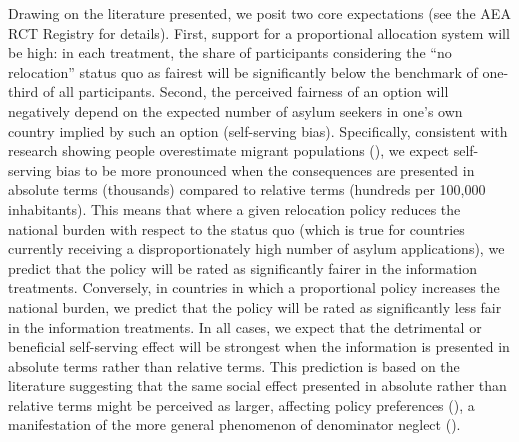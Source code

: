\documentclass[
  12pt,
  a4paper,
]{article}
\begin{document}
Drawing on the literature presented, we posit two core expectations (see the AEA RCT Registry for details). First, support for a proportional allocation system will be high: in each treatment, the share of participants considering the ``no relocation'' status quo as fairest will be significantly below the benchmark of one-third of all participants. Second, the perceived fairness of an option will negatively depend on the expected number of asylum seekers in one's own country implied by such an option (self-serving bias). Specifically, consistent with research showing people overestimate migrant populations (), we expect self-serving bias to be more pronounced when the consequences are presented in absolute terms (thousands) compared to relative terms (hundreds per 100,000 inhabitants). This means that where a given relocation policy reduces the national burden with respect to the status quo (which is true for countries currently receiving a disproportionately high number of asylum applications), we predict that the policy will be rated as significantly fairer in the information treatments. Conversely, in countries in which a proportional policy increases the national burden, we predict that the policy will be rated as significantly less fair in the information treatments. In all cases, we expect that the detrimental or beneficial self-serving effect will be strongest when the information is presented in absolute terms rather than relative terms. This prediction is based on the literature suggesting that the same social effect presented in absolute rather than relative terms might be perceived as larger, affecting policy preferences (), a manifestation of the more general phenomenon of denominator neglect ().
\end{document}
